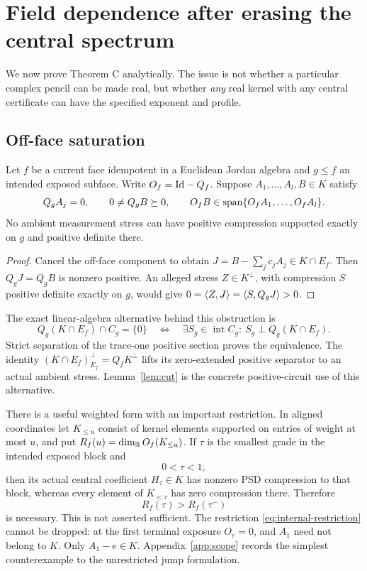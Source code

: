 \section{Field dependence after erasing the central spectrum}\label{sec:separation}
We now prove Theorem C analytically. The issue is not whether a particular complex pencil can be made real, but whether \emph{any} real kernel with any central certificate can have the specified exponent and profile.

\subsection{Off-face saturation}
\begin{lemma}\label{lem:cut}
Let $f$ be a current face idempotent in a Euclidean Jordan algebra and $g\le f$ an intended exposed subface. Write $O_f=\mathrm{Id}-Q_f$. Suppose $A_1,\ldots,A_l,B\in K$ satisfy
\[
 Q_gA_j=0,\qquad 0\ne Q_gB\succeq0,\qquad
 O_fB\in\operatorname{span}\{O_fA_1,\ldots,O_fA_l\}.
\]
No ambient measurement stress can have positive compression supported exactly on $g$ and positive definite there.
\end{lemma}
\begin{proof}
Cancel the off-face component to obtain $J=B-\sum_jc_jA_j\in K\cap E_f$. Then $Q_gJ=Q_gB$ is nonzero positive. An alleged stress $Z\in K^\perp$, with compression $S$ positive definite exactly on $g$, would give $0=\langle Z,J\rangle=\langle S,Q_gJ\rangle>0$.
\end{proof}

The exact linear-algebra alternative behind this obstruction is
\[
 Q_g(K\cap E_f)\cap C_g=\{0\}
 \quad\Longleftrightarrow\quad
 \exists S_g\in\operatorname{int}C_g:\ S_g\perp Q_g(K\cap E_f).
\]
Strict separation of the trace-one positive section proves the equivalence. The identity $(K\cap E_f)^\perp_{E_f}=Q_fK^\perp$ lifts its zero-extended positive separator to an actual ambient stress. Lemma~\ref{lem:cut} is the concrete positive-circuit use of this alternative.

There is a useful weighted form with an important restriction. In aligned coordinates let $K_{\le u}$ consist of kernel elements supported on entries of weight at most $u$, and put $R_f(u)=\dim_{\mathbb R}O_f(K_{\le u})$. If $\tau$ is the smallest grade in the intended exposed block and
\begin{equation}\label{eq:internal-restriction}
 0<\tau<1,
\end{equation}
then its actual central coefficient $H_\tau\in K$ has nonzero PSD compression to that block, whereas every element of $K_{<\tau}$ has zero compression there. Therefore
\begin{equation}\label{eq:cutjump}
 R_f(\tau)>R_f(\tau^-)
\end{equation}
is necessary. This is not asserted sufficient. The restriction \eqref{eq:internal-restriction} cannot be dropped: at the first terminal exposure $O_e=0$, and $A_1$ need not belong to $K$. Only $A_1-e\in K$. Appendix~\ref{app:scope} records the simplest counterexample to the unrestricted jump formulation.

